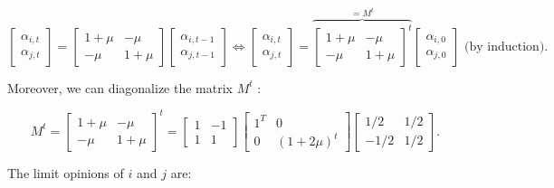 \documentclass{article}
\begin{document}
\[
 \begin{bmatrix}
\alpha_{i,t} \\
\alpha_{j,t}
 \end{bmatrix}
=
 \begin{bmatrix}
1 + \mu & - \mu    \\
- \mu  & 1 + \mu  \end{bmatrix}
 \begin{bmatrix}
\alpha_{i,t-1}  \\
\alpha_{j,t-1}
 \end{bmatrix} \Leftrightarrow
 \begin{bmatrix}
\alpha_{i,t} \\
\alpha_{j,t}
 \end{bmatrix}
=
 \overbrace{\begin{bmatrix} 
1 + \mu & -\mu    \\
-\mu  & 1 + \mu  \end{bmatrix} ^t }^{= M^t}
 \begin{bmatrix} 
\alpha_{i,0}  \\
\alpha_{j,0}
 \end{bmatrix} \text{ (by induction). }\] 
 
\noindent Moreover, we can diagonalize the matrix $M^t$ : 
 
 \[ 
 M^t =
{ \begin{bmatrix} 
1 + \mu & -\mu    \\
-\mu  & 1 + \mu  \end{bmatrix} }^t 
=
 \begin{bmatrix}
1  & -1    \\
1  & 1
 \end{bmatrix}
 \begin{bmatrix} 
1^T  & 0    \\
0  & (1+ 2\mu)^t
 \end{bmatrix} 
  \begin{bmatrix}
1/2  & 1/2    \\
-1/2  & 1/2
 \end{bmatrix}.
 \] 

\noindent  The limit opinions of $i$ and $j$ are: 
\end{document}
